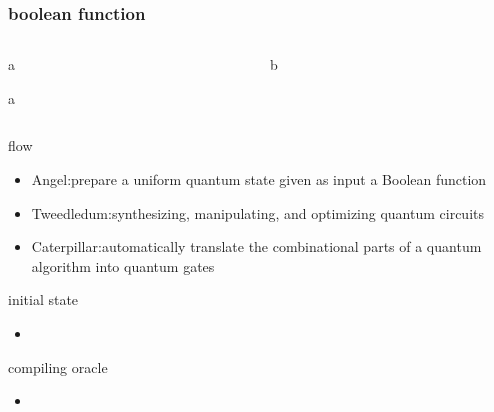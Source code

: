 \documentclass[aspectratio=1610]{beamer}
\begin{document}
\begin{frame}[fragile]
  \frametitle{boolean function}
  \begin{columns}
    \begin{column}{.5\linewidth}
      \begin{block}{a}
        \begin{python}
          a
        \end{python}
      \end{block}
    \end{column}
    \begin{column}{.5\linewidth}
      b
    \end{column}
  \end{columns}
\end{frame}
\begin{frame}{flow}
  \begin{itemize}
    \item Angel:prepare a uniform quantum state
    given as input a Boolean function
    \item Tweedledum:synthesizing,
    manipulating, and optimizing quantum circuits
    \item Caterpillar:automatically translate the combinational parts of a quantum
    algorithm into quantum gates
  \end{itemize}
\end{frame}
\begin{frame}{initial state}
  \begin{itemize}
    \item 
  \end{itemize}
\end{frame}
\begin{frame}{compiling oracle}
  \begin{itemize}
    \item 
  \end{itemize}
\end{frame}
\end{document}
